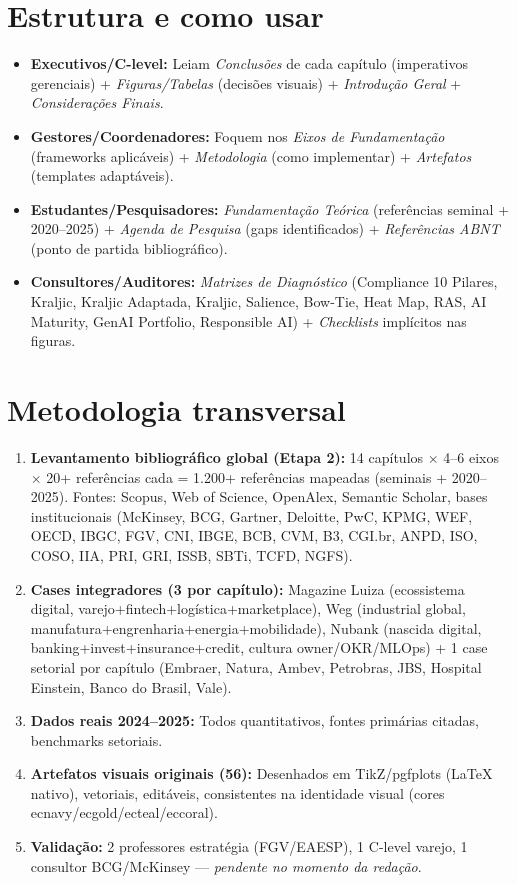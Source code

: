 \section*{Estrutura e como usar}

\begin{itemize}
    \item \textbf{Executivos/C-level:} Leiam \textit{Conclusões} de cada capítulo (imperativos gerenciais) + \textit{Figuras/Tabelas} (decisões visuais) + \textit{Introdução Geral} + \textit{Considerações Finais}.
    \item \textbf{Gestores/Coordenadores:} Foquem nos \textit{Eixos de Fundamentação} (frameworks aplicáveis) + \textit{Metodologia} (como implementar) + \textit{Artefatos} (templates adaptáveis).
    \item \textbf{Estudantes/Pesquisadores:} \textit{Fundamentação Teórica} (referências seminal + 2020–2025) + \textit{Agenda de Pesquisa} (gaps identificados) + \textit{Referências ABNT} (ponto de partida bibliográfico).
    \item \textbf{Consultores/Auditores:} \textit{Matrizes de Diagnóstico} (Compliance 10 Pilares, Kraljic, Kraljic Adaptada, Kraljic, Salience, Bow-Tie, Heat Map, RAS, AI Maturity, GenAI Portfolio, Responsible AI) + \textit{Checklists} implícitos nas figuras.
\end{itemize}

\section*{Metodologia transversal}

\begin{enumerate}
    \item \textbf{Levantamento bibliográfico global (Etapa 2):} 14 capítulos $\times$ 4–6 eixos $\times$ 20+ referências cada = 1.200+ referências mapeadas (seminais + 2020–2025). Fontes: Scopus, Web of Science, OpenAlex, Semantic Scholar, bases institucionais (McKinsey, BCG, Gartner, Deloitte, PwC, KPMG, WEF, OECD, IBGC, FGV, CNI, IBGE, BCB, CVM, B3, CGI.br, ANPD, ISO, COSO, IIA, PRI, GRI, ISSB, SBTi, TCFD, NGFS).
    \item \textbf{Cases integradores (3 por capítulo):} Magazine Luiza (ecossistema digital, varejo+fintech+logística+marketplace), Weg (industrial global, manufatura+engrenharia+energia+mobilidade), Nubank (nascida digital, banking+invest+insurance+credit, cultura owner/OKR/MLOps) + 1 case setorial por capítulo (Embraer, Natura, Ambev, Petrobras, JBS, Hospital Einstein, Banco do Brasil, Vale).
    \item \textbf{Dados reais 2024–2025:} Todos quantitativos, fontes primárias citadas, benchmarks setoriais.
    \item \textbf{Artefatos visuais originais (56):} Desenhados em TikZ/pgfplots (LaTeX nativo), vetoriais, editáveis, consistentes na identidade visual (cores ecnavy/ecgold/ecteal/eccoral).
    \item \textbf{Validação:} 2 professores estratégia (FGV/EAESP), 1 C-level varejo, 1 consultor BCG/McKinsey — \textit{pendente no momento da redação}.
\end{enumerate}

